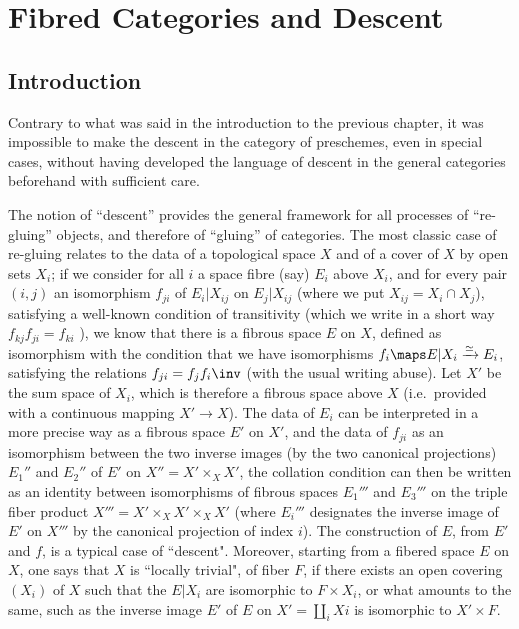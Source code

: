 \setcounter{chapter}{5}

\chapter{Fibred Categories and Descent}

\setcounter{section}{-1}

\section{Introduction}

Contrary to what was said in the introduction to the previous chapter, it was impossible to make the descent in the category of preschemes, even in special cases, without having developed the language of descent in the general categories beforehand with sufficient care.

The notion of ``descent'' provides the general framework for all processes of ``re-gluing'' objects, and therefore of ``gluing'' of categories. The most classic case of re-gluing relates to the data of a topological space $X$ and of a cover of $X$ by open sets $X_i$; if we consider for all $i$ a space fibre (say) $E_i$ above $X_i$, and for every pair $(i, j)$ an isomorphism $f_{ji}$ of $E_i| X_{ij}$ on $E_j | X_{ij}$ (where we put $X_{ij} = X_i \cap X_j$), satisfying a well-known condition of transitivity (which we write in a short way $f_{kj} f_{ji} = f_{ki}$ ), we know that there is a fibrous space $E$ on $X$, defined as isomorphism with the condition that we have isomorphisms $f_i \maps E | X_i \xrightarrow{\simeq} E_i$, satisfying the relations $f_{ji} = f_jf_i\inv$ (with the usual writing abuse). Let $X'$ be the sum space of $X_i$, which is therefore a fibrous space above $X$ (i.e.\ provided with a continuous mapping $X' \to X$). The data of $E_i$ can be interpreted in a more precise way as a fibrous space $E'$ on $X'$, and the data of $f_{ji}$ as an isomorphism between the two inverse images (by the two canonical projections) $E_1''$ and $E_2''$ of $E'$ on $X''= X' \times_X X'$, the collation condition can then be written as an identity between isomorphisms of fibrous spaces $E_1'''$ and $E_3'''$ on the triple fiber product $X'''= X' \times_X X' \times_X X'$ (where $E_i'''$ designates the inverse image of $E'$ on $X'''$ by the canonical projection of index $i$). The construction of $E$, from $E '$ and $f$, is a typical case of ``descent". Moreover, starting from a fibered space $E$ on $X$, one says that $X$ is ``locally trivial", of fiber $F$, if there exists an open covering $(X_i)$ of $X$ such that the $E| X_i$ are isomorphic to $F \times X_i$, or what amounts to the same, such as the inverse image $E'$ of $E$ on $X' = \coprod_i Xi$ is isomorphic to $X '\times F$.

